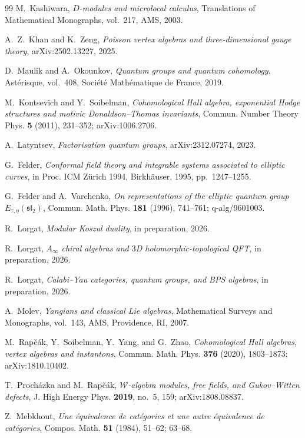 \documentclass[11pt,reqno]{amsart}
\theoremstyle{definition}
\theoremstyle{remark}
\numberwithin{equation}{section}
\begin{document}
\begin{thebibliography}{99}
M.~Kashiwara,
\emph{$D$-modules and microlocal calculus},
Translations of Mathematical Monographs, vol.~217,
AMS, 2003.

A.~Z.~Khan and K.~Zeng,
\emph{Poisson vertex algebras and three-dimensional gauge
theory},
arXiv:2502.13227, 2025.

D.~Maulik and A.~Okounkov,
\emph{Quantum groups and quantum cohomology},
Ast\'erisque, vol.~408, Soci\'et\'e Math\'ematique de France, 2019.

M.~Kontsevich and Y.~Soibelman,
\emph{Cohomological Hall algebra, exponential Hodge
structures and motivic Donaldson--Thomas invariants},
Commun. Number Theory Phys. \textbf{5} (2011), 231--352;
arXiv:1006.2706.

A.~Latyntsev,
\emph{Factorisation quantum groups},
arXiv:2312.07274, 2023.

G.~Felder,
\emph{Conformal field theory and integrable systems
associated to elliptic curves},
in Proc. ICM Z\"urich 1994, Birkh\"auser, 1995,
pp.~1247--1255.

G.~Felder and A.~Varchenko,
\emph{On representations of the elliptic quantum group
$E_{\tau,\eta}(\mathfrak{sl}_2)$},
Commun. Math. Phys. \textbf{181} (1996), 741--761;
q-alg/9601003.

R.~Lorgat,
\emph{Modular Koszul duality},
in preparation, 2026.

R.~Lorgat,
\emph{$A_\infty$ chiral algebras and $3$D
holomorphic-topological QFT},
in preparation, 2026.

R.~Lorgat,
\emph{Calabi--Yau categories, quantum groups, and BPS
algebras},
in preparation, 2026.

A.~Molev,
\emph{Yangians and classical Lie algebras},
Mathematical Surveys and Monographs, vol.~143,
AMS, Providence, RI, 2007.

M.~Rap\v{c}\'ak, Y.~Soibelman, Y.~Yang, and G.~Zhao,
\emph{Cohomological Hall algebras, vertex algebras and
instantons},
Commun. Math. Phys. \textbf{376} (2020), 1803--1873;
arXiv:1810.10402.

T.~Proch\'azka and M.~Rap\v{c}\'ak,
\emph{$\mathcal{W}$-algebra modules, free fields, and
Gukov--Witten defects},
J. High Energy Phys. \textbf{2019}, no.~5, 159;
arXiv:1808.08837.

Z.~Mebkhout,
\emph{Une \'equivalence de cat\'egories
et une autre \'equivalence de cat\'egories},
Compos. Math. \textbf{51} (1984), 51--62; 63--68.


\end{thebibliography}
\end{document}

